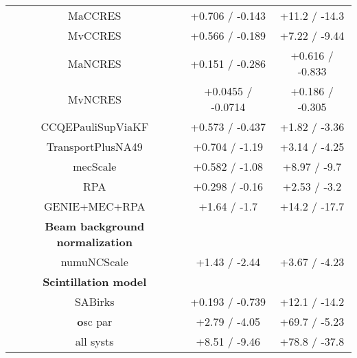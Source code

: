 \begin{table*}[t]
\begin{tabular}{c c c}
    MaCCRES & +0.706 / -0.143 & +11.2 / -14.3\\
    MvCCRES & +0.566 / -0.189 & +7.22 / -9.44\\
    MaNCRES & +0.151 / -0.286 & +0.616 / -0.833\\
    MvNCRES & +0.0455 / -0.0714 & +0.186 / -0.305\\
    CCQEPauliSupViaKF & +0.573 / -0.437 & +1.82 / -3.36\\
    TransportPlusNA49 & +0.704 / -1.19 & +3.14 / -4.25\\
    mecScale & +0.582 / -1.08 & +8.97 / -9.7\\
    RPA & +0.298 / -0.16 & +2.53 / -3.2\\
    GENIE+MEC+RPA & +1.64 / -1.7 & +14.2 / -17.7\\
    \textbf{Beam background normalization} & & \\
    numuNCScale & +1.43 / -2.44 & +3.67 / -4.23\\
    \textbf{Scintillation model} & & \\
    SABirks & +0.193 / -0.739 & +12.1 / -14.2\\
    \textbf
    osc par & +2.79 / -4.05 & +69.7 / -5.23\\
    \hline
    all systs & +8.51 / -9.46 & +78.8 / -37.8\\
    \hline
  \end{tabular}
  \label{tab:systShifts}
\end{table*}








